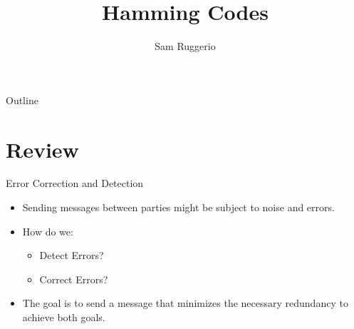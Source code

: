 \documentclass[aspectratio=169, handout]{beamer}
\title{Hamming Codes}
\author{Sam Ruggerio}
\date{}
\begin{document}

\begin{frame}
\titlepage
\end{frame}

\begin{frame}{Outline}
  \tableofcontents
\end{frame}

\section{Review}
\frame{\sectionpage}
\begin{frame}{Error Correction and Detection}
    \begin{itemize}
        \item Sending messages between parties might be subject to noise and errors. \pause
        \item How do we: \pause
            \begin{itemize}
                \item Detect Errors? \pause
                \item Correct Errors? \pause
            \end{itemize}
        \item The goal is to send a message that minimizes the necessary redundancy to achieve both goals.
    \end{itemize}
\end{frame}
\end{document}
